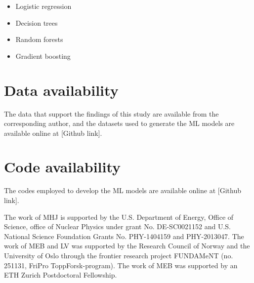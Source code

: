 \documentclass[superscriptaddress,unsortedaddress,
 amsmath,amssymb,
 aps,
]{revtex4-2}
\begin{document}
\begin{itemize}
    \item Logistic regression
    \item Decision trees
    \item Random forests
    \item Gradient boosting
\end{itemize}



\section*{Data availability} 

The data that support the findings of this study are available from the corresponding author, and the datasets used to generate the ML models are available online at [Github link]. 

\section*{Code availability} 
The codes employed to develop the ML models are available online at [Github link]. 


\begin{acknowledgments}

The work of MHJ is supported by the U.S. Department of Energy,
Office of Science, office of Nuclear Physics under grant
No. DE-SC0021152 and U.S. National Science Foundation Grants
No. PHY-1404159 and PHY-2013047. 
The work of MEB and LV was supported by the Research Council of Norway and the University of Oslo through the frontier research project FUNDAMeNT (no. 251131, FriPro ToppForsk-program). 
The work of MEB was supported by an ETH Zurich Postdoctoral Fellowship. 

\end{acknowledgments}
\end{document}
